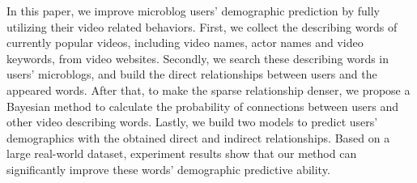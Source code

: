 In this paper, we improve microblog users' demographic prediction by fully utilizing their video related behaviors. First, we collect the describing words of currently popular videos, including video names, actor names and video keywords, from video websites. Secondly, we search these describing words in users' microblogs, and build the direct relationships between users and the appeared words. After that, to make the sparse relationship denser, we propose a Bayesian method to calculate the probability of connections between users and other video describing words. Lastly, we build two models to predict users' demographics with the obtained direct and indirect relationships. Based on a large real-world dataset, experiment results show that our method can significantly improve these words' demographic predictive ability.
